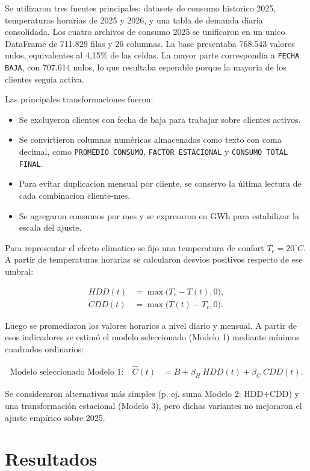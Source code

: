\documentclass[11pt,a4paper]{article}
\begin{document}
Se utilizaron tres fuentes principales: datasets de consumo historico 2025, temperaturas horarias de 2025 y 2026, y una tabla de demanda diaria consolidada. Los cuatro archivos de consumo 2025 se unificaron en un unico DataFrame de 711.829 filas y 26 columnas. La base presentaba 768.543 valores nulos, equivalentes al 4,15\% de las celdas. La mayor parte correspondia a \texttt{FECHA BAJA}, con 707.614 nulos, lo que resultaba esperable porque la mayoria de los clientes seguia activa.

Las principales transformaciones fueron:

\begin{itemize}
    \item Se excluyeron clientes con fecha de baja para trabajar sobre clientes activos.
    \item Se convirtieron columnas numéricas almacenadas como texto con coma decimal, como \texttt{PROMEDIO CONSUMO}, \texttt{FACTOR ESTACIONAL} y \texttt{CONSUMO TOTAL FINAL}.
    \item Para evitar duplicacion mensual por cliente, se conservo la última lectura de cada combinacion cliente-mes.
    \item Se agregaron consumos por mes y se expresaron en GWh para estabilizar la escala del ajuste.
\end{itemize}

Para representar el efecto climatico se fijo una temperatura de confort $T_c=20^\circ C$. A partir de temperaturas horarias se calcularon desvios positivos respecto de ese umbral:

\begin{align}
HDD(t) &= \max\bigl(T_c - T(t), 0\bigr),\\
CDD(t) &= \max\bigl(T(t) - T_c, 0\bigr).
\end{align}

Luego se promediaron los valores horarios a nivel diario y mensual. A partir de esos indicadores se estimó el modelo seleccionado (Modelo 1) mediante mínimos cuadrados ordinarios:

\begin{align}
\text{Modelo seleccionado Modelo 1:} \quad \widehat{C}(t) &= B + \beta_{H}~HDD(t) + \beta_{C}~CDD(t).
\end{align}

Se consideraron alternativas más simples (p. ej. suma Modelo 2: HDD+CDD) y una transformación estacional (Modelo 3), pero dichas variantes no mejoraron el ajuste empírico sobre 2025.

\section{Resultados}
\end{document}
